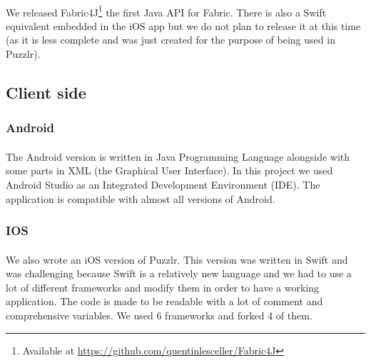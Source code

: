  			\paragraph{}
 			We released Fabric4J\footnote{Available at \url{https://github.com/quentinlesceller/Fabric4J}} the first Java API for Fabric. There is also a Swift equivalent embedded in the iOS app but we do not plan to release it at this time (as it is less complete and was just created for the purpose of being used in Puzzlr).
 	\subsection{Client side}
 		\subsubsection{Android}
  			\paragraph{}
			The Android version is written in Java Programming Language alongside with some parts in XML (the Graphical User Interface). In this project we used Android Studio as an Integrated Development Environment (IDE). The application is compatible with almost all versions of Android.
	  	
	\subsubsection{IOS}
	\paragraph{}
	We also wrote an iOS version of Puzzlr. This version was written in Swift and was challenging because Swift is a relatively new language and we had to use a lot of different frameworks and modify them in order to have a working application. The code is made to be readable with a lot of comment and comprehensive variables.
	We used 6 frameworks and forked 4 of them.

